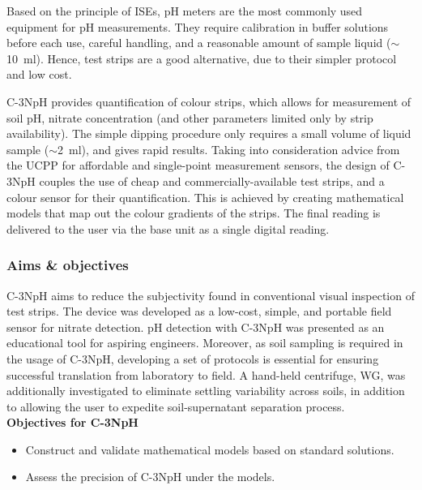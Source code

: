 Based on the principle of ISEs, pH meters are the most commonly used equipment for pH measurements. They require calibration in buffer solutions before each use, careful handling, and a reasonable amount of sample liquid ($\sim$\SI{10}{\ml}). Hence, test strips are a good alternative, due to their simpler protocol and low cost. 

C-3NpH provides quantification of colour strips, which allows for measurement of soil pH, nitrate concentration (and other parameters limited only by strip availability). %
The simple dipping procedure only requires a small volume of liquid sample ($\sim$\SI{2}{\ml}), and gives rapid results. Taking into consideration advice from the \gls{UCPP} for affordable and single-point measurement sensors, the design of C-3NpH couples the use of cheap and commercially-available test strips, and a colour sensor for their quantification. This is achieved by creating mathematical models that map out the colour gradients of the strips. The final reading is delivered to the user via the base unit as a single digital reading. 


\subsubsection{Aims \& objectives} \label{sec:aimobj_c3nph}
C-3NpH aims to reduce the subjectivity found in conventional visual inspection of test strips. The device was developed as a low-cost, simple, and portable field sensor for nitrate detection. pH detection with C-3NpH was presented as an educational tool for aspiring engineers. Moreover, as soil sampling is required in the usage of C-3NpH, developing a set of protocols is essential for ensuring successful translation from laboratory to field. A hand-held centrifuge, \gls{WG}, was additionally investigated to eliminate settling variability across soils, in addition to allowing the user to expedite soil-supernatant separation process. \\

\textbf{Objectives for C-3NpH}
\begin{itemize}
    \item Construct and validate mathematical models based on standard solutions.
    \item Assess the precision of C-3NpH under the models.
\end{itemize}

